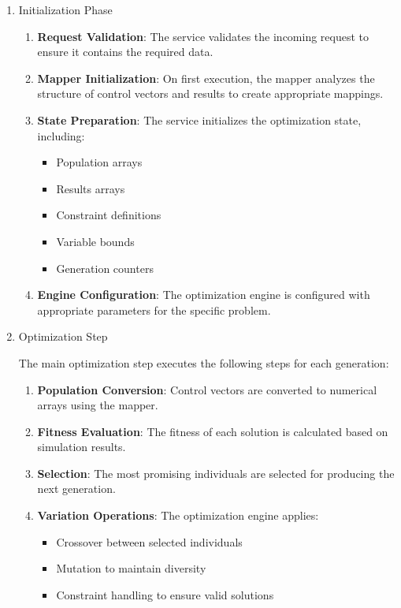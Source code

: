 \begin{enumerate}

\item Initialization Phase

\begin{enumerate}
	\item \textbf{Request Validation}: The service validates the incoming request to ensure it contains the required data.

	\item \textbf{Mapper Initialization}: On first execution, the mapper analyzes the structure of control vectors and results to create appropriate mappings.

	\item \textbf{State Preparation}: The service initializes the optimization state, including:
	\begin{itemize}
		\item Population arrays
		\item Results arrays
		\item Constraint definitions
		\item Variable bounds
		\item Generation counters
	\end{itemize}

	\item \textbf{Engine Configuration}: The optimization engine is configured with appropriate parameters for the specific problem.
\end{enumerate}

\item Optimization Step

The main optimization step executes the following steps for each generation:

\begin{enumerate}
	\item \textbf{Population Conversion}: Control vectors are converted to numerical arrays using the mapper.

	\item \textbf{Fitness Evaluation}: The fitness of each solution is calculated based on simulation results.

	\item \textbf{Selection}: The most promising individuals are selected for producing the next generation.

	\item \textbf{Variation Operations}: The optimization engine applies:
	\begin{itemize}
		\item Crossover between selected individuals
		\item Mutation to maintain diversity
		\item Constraint handling to ensure valid solutions
	\end{itemize}


\end{enumerate}
\end{enumerate}
